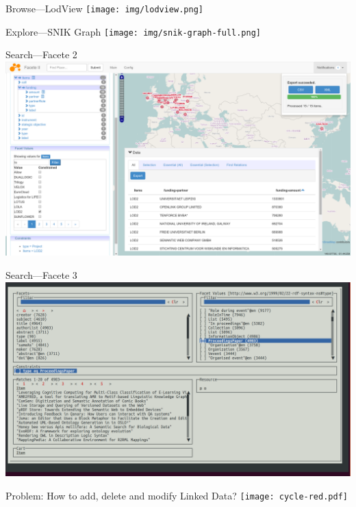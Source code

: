 \documentclass[aspectratio=1610]{beamer}
\begin{document}
\begin{frame}{Browse---LodView}
\centering
\texttt{[image: img/lodview.png]}
\end{frame}

\begin{frame}{Explore---SNIK Graph}
\centering
\texttt{[image: img/snik-graph-full.png]}
\end{frame}

\begin{frame}{Search---Facete 2}
\centering
\includegraphics[width=\textwidth]{img/facete2.png}
\end{frame}

\begin{frame}{Search---Facete 3}
\centering
\includegraphics[width=\textwidth]{img/facete3.png}
\end{frame}

\begin{frame}{Problem: How to add, delete and modify Linked Data?}
\centering
\texttt{[image: cycle-red.pdf]}
\end{frame}
\end{document}
